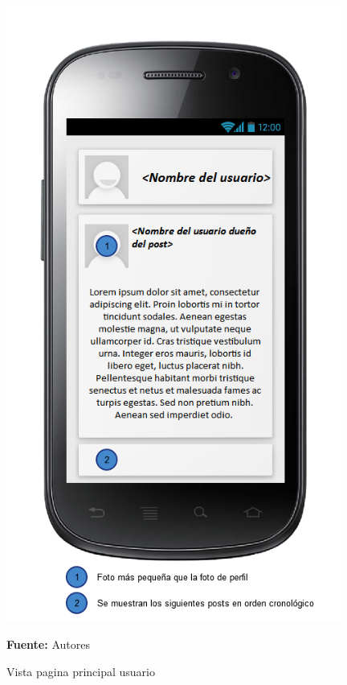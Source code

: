 \begin{figure}[!htb]
  \begin{center}
\includegraphics[width=11cm]{./imagenes/UI/Usuarios/pagina_principal_usuario.png}
    \caption{Vista pagina principal usuario}
    \label{fig:Vista_pagina_principal_usuario}
    \textbf{Fuente:}  Autores
  \end{center}
\end{figure}
